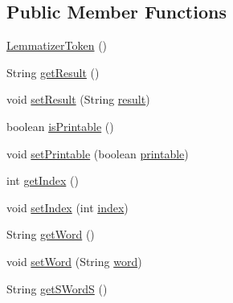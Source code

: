 \subsection*{Public Member Functions}
\begin{DoxyCompactItemize}
\item 
\hyperlink{classbr_1_1usp_1_1cata_1_1util_1_1lemmatizer_1_1_lemmatizer_token_a2c64257626327c0452d521989a616b8f}{Lemmatizer\+Token} ()
\item 
String \hyperlink{classbr_1_1usp_1_1cata_1_1util_1_1lemmatizer_1_1_lemmatizer_token_a53a36afafd7475fcab580091ab42356b}{get\+Result} ()
\item 
void \hyperlink{classbr_1_1usp_1_1cata_1_1util_1_1lemmatizer_1_1_lemmatizer_token_aeace07699a708b35b32d58c1dd402390}{set\+Result} (String \hyperlink{classbr_1_1usp_1_1cata_1_1util_1_1lemmatizer_1_1_lemmatizer_token_a535b666da5f81475704586f61173323b}{result})
\item 
boolean \hyperlink{classbr_1_1usp_1_1cata_1_1util_1_1lemmatizer_1_1_lemmatizer_token_abc698cf037ea29a3d4ecf946f048840f}{is\+Printable} ()
\item 
void \hyperlink{classbr_1_1usp_1_1cata_1_1util_1_1lemmatizer_1_1_lemmatizer_token_a69087a7bb67e2f2c1faff636aa02968f}{set\+Printable} (boolean \hyperlink{classbr_1_1usp_1_1cata_1_1util_1_1lemmatizer_1_1_lemmatizer_token_a00fe0df36c0a9f75ebd37bbe15b7e6f0}{printable})
\item 
int \hyperlink{classbr_1_1usp_1_1cata_1_1util_1_1lemmatizer_1_1_lemmatizer_token_a8af98f80faabec6101e9fa73d5ba16a0}{get\+Index} ()
\item 
void \hyperlink{classbr_1_1usp_1_1cata_1_1util_1_1lemmatizer_1_1_lemmatizer_token_a7848f588b09bb11c4c30ad2d3e2e7db3}{set\+Index} (int \hyperlink{classbr_1_1usp_1_1cata_1_1util_1_1lemmatizer_1_1_lemmatizer_token_a666f58e28bce2bbdb02cec7da5161ad9}{index})
\item 
String \hyperlink{classbr_1_1usp_1_1cata_1_1util_1_1lemmatizer_1_1_lemmatizer_token_aff201e80ab0da876e65c3fd5b386e631}{get\+Word} ()
\item 
void \hyperlink{classbr_1_1usp_1_1cata_1_1util_1_1lemmatizer_1_1_lemmatizer_token_a15d02c72374903304f157574391931ee}{set\+Word} (String \hyperlink{classbr_1_1usp_1_1cata_1_1util_1_1lemmatizer_1_1_lemmatizer_token_af91667ab0a104dc6fa74545485e8be01}{word})
\item 
String \hyperlink{classbr_1_1usp_1_1cata_1_1util_1_1lemmatizer_1_1_lemmatizer_token_aaba875241123efcab4b633ec84e8945d}{get\+S\+Word\+S} ()
\item 

\end{DoxyCompactItemize}
